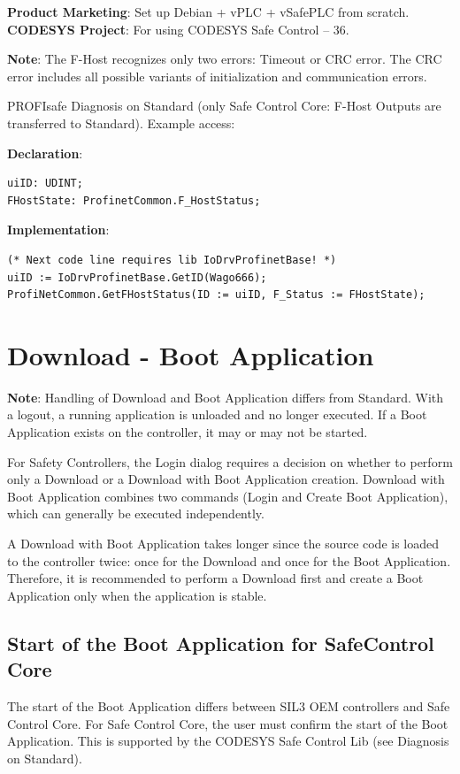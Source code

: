 \documentclass[a4paper,12pt]{article}
\begin{document}
\textbf{Product Marketing}: Set up Debian + vPLC + vSafePLC from scratch. \\
\textbf{CODESYS Project}: For using CODESYS Safe Control – 36.

\textbf{Note}: The F-Host recognizes only two errors: Timeout or CRC error. The CRC error includes all possible variants of initialization and communication errors.

PROFIsafe Diagnosis on Standard (only Safe Control Core: F-Host Outputs are transferred to Standard). Example access:

\textbf{Declaration}:
\begin{lstlisting}
uiID: UDINT;
FHostState: ProfinetCommon.F_HostStatus;
\end{lstlisting}

\textbf{Implementation}:
\begin{lstlisting}
(* Next code line requires lib IoDrvProfinetBase! *)
uiID := IoDrvProfinetBase.GetID(Wago666);
ProfiNetCommon.GetFHostStatus(ID := uiID, F_Status := FHostState);
\end{lstlisting}

\section{Download - Boot Application}
\textbf{Note}: Handling of Download and Boot Application differs from Standard. With a logout, a running application is unloaded and no longer executed. If a Boot Application exists on the controller, it may or may not be started.

For Safety Controllers, the Login dialog requires a decision on whether to perform only a Download or a Download with Boot Application creation. Download with Boot Application combines two commands (Login and Create Boot Application), which can generally be executed independently.

A Download with Boot Application takes longer since the source code is loaded to the controller twice: once for the Download and once for the Boot Application. Therefore, it is recommended to perform a Download first and create a Boot Application only when the application is stable.

\subsection{Start of the Boot Application for SafeControl Core}
The start of the Boot Application differs between SIL3 OEM controllers and Safe Control Core. For Safe Control Core, the user must confirm the start of the Boot Application. This is supported by the CODESYS Safe Control Lib (see Diagnosis on Standard).
\end{document}
